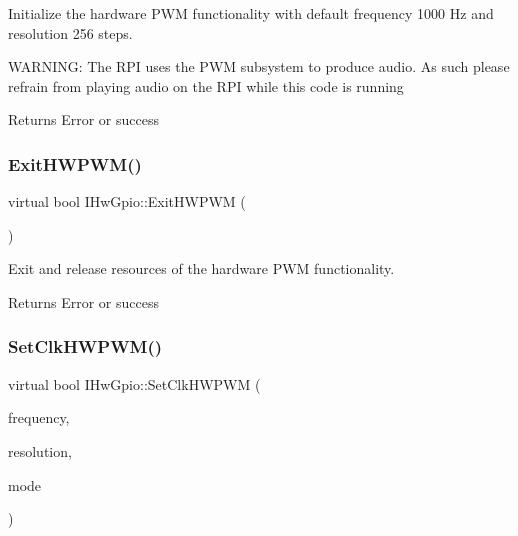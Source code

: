 Initialize the hardware P\+WM functionality with default frequency 1000 Hz and resolution 256 steps. 

W\+A\+R\+N\+I\+NG\+: The R\+PI uses the P\+WM subsystem to produce audio. As such please refrain from playing audio on the R\+PI while this code is running \begin{DoxyReturn}{Returns}
Error or success 
\end{DoxyReturn}
\mbox{\label{classIHwGpio_a66811dfbca832afe93774dc50cff8579}} 
\subsubsection{\texorpdfstring{Exit\+H\+W\+P\+W\+M()}{ExitHWPWM()}}
{\footnotesize\ttfamily virtual bool I\+Hw\+Gpio\+::\+Exit\+H\+W\+P\+WM (\begin{DoxyParamCaption}{ }\end{DoxyParamCaption})\hspace{0.3cm}{\ttfamily [pure virtual]}}



Exit and release resources of the hardware P\+WM functionality. 

\begin{DoxyReturn}{Returns}
Error or success 
\end{DoxyReturn}
\mbox{\label{classIHwGpio_afe7c0f0224564e0c480199ef2f9518d8}} 
\subsubsection{\texorpdfstring{Set\+Clk\+H\+W\+P\+W\+M()}{SetClkHWPWM()}}
{\footnotesize\ttfamily virtual bool I\+Hw\+Gpio\+::\+Set\+Clk\+H\+W\+P\+WM (\begin{DoxyParamCaption}\item[{double}]{frequency,  }\item[{uint32\+\_\+t}]{resolution,  }\item[{\hyperlink{HwGpio_8h_a4f85e40afc7a7a55f67f869d4f304c94}{E\+Hw\+Gpio\+H\+W\+P\+W\+M\+Mode}}]{mode }\end{DoxyParamCaption})\hspace{0.3cm}{\ttfamily [pure virtual]}}




